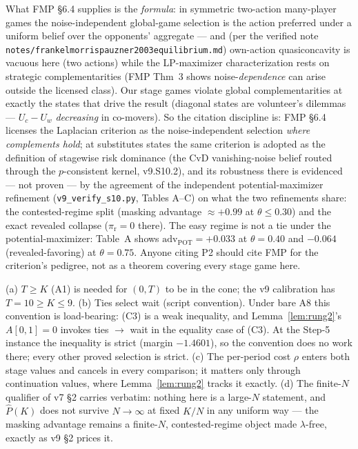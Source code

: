 \begin{remark}
What FMP \S 6.4 supplies is the \emph{formula}: in symmetric two-action many-player games the noise-independent global-game selection is the action preferred under a uniform belief over the opponents' aggregate --- and (per the verified note \texttt{notes/frankelmorrispauzner2003equilibrium.md}) own-action quasiconcavity is vacuous here (two actions) while the LP-maximizer characterization rests on strategic complementarities (FMP Thm~3 shows noise-\emph{dependence} can arise outside the licensed class). Our stage games violate global complementarities at exactly the states that drive the result (diagonal states are volunteer's dilemmas --- $U_c - U_w$ \emph{decreasing} in co-movers). So the citation discipline is: FMP \S 6.4 licenses the Laplacian criterion as the noise-independent selection \emph{where complements hold}; at substitutes states the same criterion is adopted as the definition of stagewise risk dominance (the CvD vanishing-noise belief routed through the $p$-consistent kernel, v9.S10.2), and its robustness there is evidenced --- not proven --- by the agreement of the independent potential-maximizer refinement (\texttt{v9\_verify\_s10.py}, Tables A--C) on what the two refinements share: the contested-regime split (masking advantage $\approx +0.99$ at $\theta \le 0.30$) and the exact revealed collapse ($\pi_{\mathrm{r}} = 0$ there). The easy regime is not a tie under the potential-maximizer: Table~A shows $\mathrm{adv}_{\mathrm{POT}} = +0.033$ at $\theta = 0.40$ and $-0.064$ (revealed-favoring) at $\theta = 0.75$. Anyone citing P2 should cite FMP for the criterion's pedigree, not as a theorem covering every stage game here.
\end{remark}

\begin{remark}
(a) $T \ge K$ (A1) is needed for $(0,T)$ to be in the cone; the v9 calibration has $T = 10 \ge K \le 9$. (b) Ties select wait (script convention). Under bare A8 this convention is load-bearing: (C3) is a weak inequality, and Lemma~\ref{lem:rung2}'s $A[0,1] = 0$ invokes ties $\to$ wait in the equality case of (C3). At the Step-5 instance the inequality is strict (margin $-1.4601$), so the convention does no work there; every other proved selection is strict. (c) The per-period cost $\rho$ enters both stage values and cancels in every comparison; it matters only through continuation values, where Lemma~\ref{lem:rung2} tracks it exactly. (d) The finite-$N$ qualifier of v7 \S 2 carries verbatim: nothing here is a large-$N$ statement, and $\widehat P(K)$ does not survive $N \to \infty$ at fixed $K/N$ in any uniform way --- the masking advantage remains a finite-$N$, contested-regime object made $\lambda$-free, exactly as v9 \S 2 prices it.
\end{remark}

